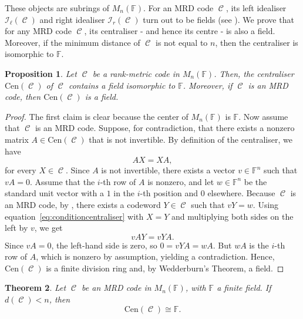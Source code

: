 \documentclass[a4paper, 11pt]{article}
\DeclareMathOperator{\C}{\mathcal{C}}
\newtheorem{theorem}{Theorem}[section]
\newtheorem{proposition}[theorem]{Proposition}
\newcommand{\F}{{\mathbb F}}
\newcommand{\lid}{\mathcal{I}_{\ell}}
\newcommand{\rid}{\mathcal{I}_{r}}
\newcommand{\cen}{\mathrm{Cen}}
\begin{document}
These objects are subrings of $M_n(\F)$. For an MRD code $\C$, its left idealiser $\lid(\C)$ and right idealiser $\rid(\C)$ turn out to be fields (see \cite[Corollary 5.6]{lunardon2018nuclei}).
We prove that for any MRD code $\C$, its centraliser - and hence its centre - is also a field. Moreover, if the minimum distance of $\C$ is not equal to $n$, then the centraliser is isomorphic to $\F$.

\begin{proposition} \label{prop:centraliserisfield}
Let $\C$ be a rank-metric code in $M_n(\F)$. Then, the centraliser $\cen(\C)$ of $\C$ contains a field isomorphic to $\F$. Moreover, if $\C$ is an MRD code, then $\cen(\C)$ is a field.
\end{proposition}

\begin{proof}
The first claim is clear because the center of \(M_n(\F)\) is \(\F\). 
Now assume that $\C$ is an MRD code. Suppose, for contradiction, that there exists a nonzero matrix $A \in \cen(\C)$ that is not invertible. By definition of the centraliser, we have
\begin{equation} \label{eq:conditioncentraliser}
AX = XA,
\end{equation}
for every $X \in \C$. Since $A$ is not invertible, there exists a vector $v \in \F^n$ such that $vA = 0$. Assume that the $i$-th row of $A$ is nonzero, and let $w \in \F^n$ be the standard unit vector with a $1$ in the $i$-th position and $0$ elsewhere. Because $\C$ is an MRD code, by \cite[Theorem 5.1]{lunardon2018nuclei}, there exists a codeword $Y \in \C$ such that $vY = w$. Using equation~\eqref{eq:conditioncentraliser} with $X = Y$ and multiplying both sides on the left by $v$, we get
\[
vAY = vYA.
\]
Since $vA = 0$, the left-hand side is zero, so $0 = vYA = wA$. But $wA$ is the $i$-th row of $A$, which is nonzero by assumption, yielding a contradiction. Hence, $\cen(\C)$ is  a finite division ring and, by Wedderburn's Theorem, a field.
\end{proof}

\begin{theorem} \label{cor:centraliserisfieldMRD}
Let $\C$ be an MRD code in $M_n(\F)$, with $\F$ a finite field. If $d(\C) < n$, then
\[
\cen(\C) \cong \F.
\]
\end{theorem}
\end{document}
